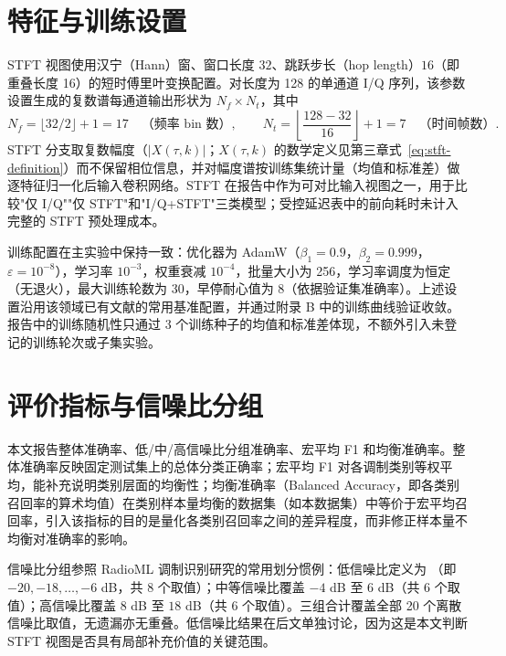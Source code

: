 \section{特征与训练设置}\label{sec:feature-training}

STFT 视图使用汉宁（Hann）窗、窗口长度 \(32\)、跳跃步长（hop length）\(16\)（即重叠长度 16）的短时傅里叶变换配置。对长度为 128 的单通道 I/Q 序列，该参数设置生成的复数谱每通道输出形状为 \(N_f\times N_t\)，其中
\begin{equation*}
  N_f = \lfloor 32/2 \rfloor + 1 = 17 \quad\text{（频率 bin 数）},\qquad
  N_t = \left\lfloor\frac{128-32}{16}\right\rfloor + 1 = 7 \quad\text{（时间帧数）}.
\end{equation*}
STFT 分支取复数幅度（\(\lvert X(\tau,k)\rvert\)；\(X(\tau,k)\) 的数学定义见第三章式~\eqref{eq:stft-definition}）而不保留相位信息，并对幅度谱按训练集统计量（均值和标准差）做逐特征归一化后输入卷积网络。STFT 在报告中作为可对比输入视图之一，用于比较"仅 I/Q""仅 STFT"和"I/Q+STFT"三类模型；受控延迟表中的前向耗时未计入完整的 STFT 预处理成本。

训练配置在主实验中保持一致：优化器为 AdamW\cite{loshchilov2019adamw}（\(\beta_1{=}0.9\)，\(\beta_2{=}0.999\)，\(\varepsilon{=}10^{-8}\)\cite{kingma2015adam}），学习率 \(10^{-3}\)，权重衰减 \(10^{-4}\)，批量大小为 256，学习率调度为恒定（无退火），最大训练轮数为 30，早停耐心值为 8（依据验证集准确率）。上述设置沿用该领域已有文献\cite{oshea2016cnn,xu2020mcldnn}的常用基准配置，并通过附录 B 中的训练曲线验证收敛。报告中的训练随机性只通过 3 个训练种子的均值和标准差体现，不额外引入未登记的训练轮次或子集实验。

\section{评价指标与信噪比分组}

本文报告整体准确率、低/中/高信噪比分组准确率、宏平均 F1 和均衡准确率。整体准确率反映固定测试集上的总体分类正确率；宏平均 F1 对各调制类别等权平均，能补充说明类别层面的均衡性；均衡准确率（Balanced Accuracy，即各类别召回率的算术均值）在类别样本量均衡的数据集（如本数据集）中等价于宏平均召回率，引入该指标的目的是量化各类别召回率之间的差异程度，而非修正样本量不均衡对准确率的影响。

信噪比分组参照 RadioML 调制识别研究的常用划分惯例\cite{oshea2016radioml}：低信噪比定义为 \lowSNR{}（即 \(-20,-18,\ldots,-6\) dB，共 8 个取值）；中等信噪比覆盖 \(-4\) dB 至 \(6\) dB（共 6 个取值）；高信噪比覆盖 \(8\) dB 至 \(18\) dB（共 6 个取值）。三组合计覆盖全部 20 个离散信噪比取值，无遗漏亦无重叠。低信噪比结果在后文单独讨论，因为这是本文判断 STFT 视图是否具有局部补充价值的关键范围。

